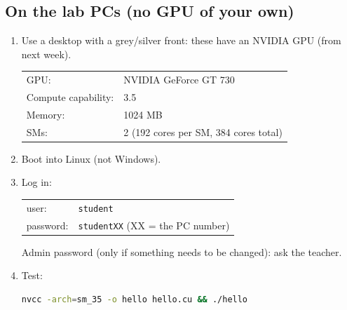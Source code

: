 \documentclass[11pt,a4paper]{article}
\begin{document}
\subsection{On the lab PCs (no GPU of your own)}
\begin{enumerate}
  \item Use a desktop with a grey/silver front: these have an NVIDIA GPU (from next week).

  \begin{tabular}{@{}ll}
    GPU: & NVIDIA GeForce GT 730\\
    Compute capability: & 3.5\\
    Memory: & 1024 MB\\
    SMs: & 2 (192 cores per SM, 384 cores total)
  \end{tabular}
  \item Boot into Linux (not Windows).
  \item Log in:

  \begin{tabular}{@{}ll}
    user: & \texttt{student}\\
    password: & \texttt{studentXX} \quad (XX = the PC number)
  \end{tabular}

  Admin password (only if something needs to be changed): ask the teacher.
  \item Test:
\begin{lstlisting}[language=bash,numbers=none]
nvcc -arch=sm_35 -o hello hello.cu && ./hello
\end{lstlisting}
\end{enumerate}
\end{document}
